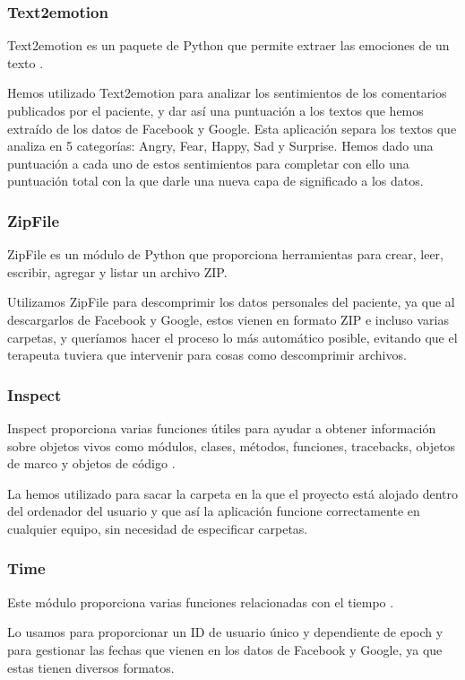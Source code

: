 		\subsubsection*{Text2emotion}
 			Text2emotion es un paquete de Python que permite extraer las emociones de un texto \citep{Text2}.   
 		
 		   Hemos utilizado Text2emotion para analizar los sentimientos de los comentarios publicados por el paciente, y dar así una puntuación a los textos que hemos extraído de los datos de Facebook y Google. Esta aplicación separa los textos que analiza en 5 categorías: Angry, Fear, Happy, Sad y Surprise. Hemos dado una puntuación a cada uno de estos sentimientos para completar con ello una puntuación total con la que darle una nueva capa de significado a los datos.
 		   
 		\subsubsection*{ZipFile} 
 			ZipFile es un módulo de Python que proporciona herramientas para crear, leer, escribir, agregar y listar un archivo ZIP.   
 		
 		   	Utilizamos ZipFile para descomprimir los datos personales del paciente, ya que al descargarlos de Facebook y Google, estos vienen en formato ZIP e incluso varias carpetas, y queríamos hacer el proceso lo más automático posible, evitando que el terapeuta tuviera que intervenir para cosas como descomprimir archivos.
 		   	
 		 \subsubsection*{Inspect} 
 		 	Inspect proporciona varias funciones útiles para ayudar a obtener información sobre objetos vivos como módulos, clases, métodos, funciones, tracebacks, objetos de marco y objetos de código \citep{inspect}.
 		 
 		 	 La hemos utilizado para sacar la carpeta en la que el proyecto está alojado dentro del ordenador del usuario y que así la aplicación funcione correctamente en cualquier equipo, sin necesidad de especificar carpetas. 
 		 \subsubsection*{Time} 
 		 	Este módulo proporciona varias funciones relacionadas con el tiempo \citep{time}.
 		 
 		  	Lo usamos para proporcionar un ID de usuario único y dependiente de epoch y para gestionar las fechas que vienen en los datos de Facebook y Google, ya que estas tienen diversos formatos.
 		  	
